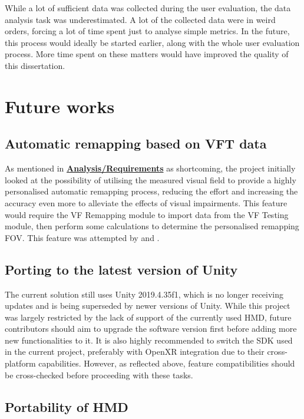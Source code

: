 \documentclass{l4proj}
\begin{document}
While a lot of sufficient data was collected during the user evaluation, the data analysis task was underestimated. A lot of the collected data were in weird orders, forcing a lot of time spent just to analyse simple metrics. In the future, this process would ideally be started earlier, along with the whole user evaluation process. More time spent on these matters would have improved the quality of this dissertation. 


\section{Future works}

\subsection{Automatic remapping based on VFT data}
As mentioned in \textbf{\hyperref[sec:analysisReq]{Analysis/Requirements}} as shortcoming, the project initially looked at the possibility of utilising the measured visual field to provide a highly personalised automatic remapping process, reducing the effort and increasing the accuracy even more to alleviate the effects of visual impairments. This feature would require the VF Remapping module to import data from the VF Testing module, then perform some calculations to determine the personalised remapping FOV. This feature was attempted by \cite{Liu2022VisualHemianopia} and \cite{Sayed2020ExpansionSpectacles}.

\subsection{Porting to the latest version of Unity}
The current solution still uses Unity 2019.4.35f1, which is no longer receiving updates and is being superseded by newer versions of Unity. While this project was largely restricted by the lack of support of the currently used HMD, future contributors should aim to upgrade the software version first before adding more new functionalities to it. It is also highly recommended to switch the SDK used in the current project, preferably with OpenXR integration due to their cross-platform capabilities. However, as reflected above, feature compatibilities should be cross-checked before proceeding with these tasks.


\subsection{Portability of HMD}
\end{document}
